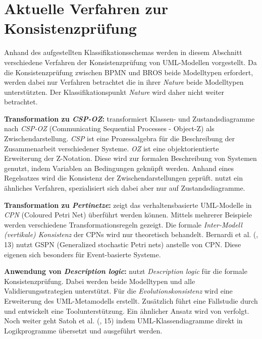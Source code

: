 \section{Aktuelle Verfahren zur Konsistenzprüfung}

Anhand des aufgestellten Klassifikationsschemas werden in diesem Abschnitt verschiedene Verfahren der Konsistenzprüfung von UML-Modellen vorgestellt.
Da die Konsistenzprüfung zwischen BPMN und BROS beide Modelltypen erfordert, werden dabei nur Verfahren betrachtet die in ihrer \emph{Nature} beide Modelltypen unterstützten.
Der Klassifikationspunkt \emph{Nature} wird daher nicht weiter betrachtet.

\textbf{Transformation zu \emph{CSP-OZ}:}
\cite{Rasch2003} transformiert Klassen- und Zustandsdiagramme nach \emph{CSP-OZ} (Communicating Sequential Processes - Object-Z) als Zwischendarstellung.
\emph{CSP} ist eine Prozessalgebra für die Beschreibung der Zusammenarbeit verschiedener Systeme. 
\emph{OZ} ist eine objektorientierte Erweiterung der Z-Notation.
Diese wird zur formalen Beschreibung von Systemen genutzt, indem Variablen an Bedingungen geknüpft werden.
Anhand eines Regelsatzes wird die Konsistenz der Zwischendarstellungen geprüft.
\cite{Kim2004} nutzt ein ähnliches Verfahren, spezialisiert sich dabei aber nur auf Zustandsdiagramme.

\textbf{Transformation zu \emph{Pertinetze}:}
\cite{Shinkawa2006} zeigt das verhaltensbasierte UML-Modelle in \emph{CPN} (Coloured Petri Net) überführt werden können.
Mittels mehrerer Beispiele werden verschiedene Transformationsregeln gezeigt.
Die formale \emph{Inter-Modell (vertikale) Konsistenz} der CPNs wird nur theoretisch behandelt.
Bernardi et al. (\cite{Usman2008}, 13) nutzt GSPN (Generalized stochastic Petri nets) anstelle von CPN.
Diese eigenen sich besonders für Event-basierte Systeme.

\textbf{Anwendung von \emph{Description logic}:}
\cite{Mens2005} nutzt \emph{Description logic} für die formale Konsistenzprüfung.
Dabei werden beide Modelltypen und alle Validierungsstrategien unterstützt.
Für die \emph{Evolutionskonsistenz} wird eine Erweiterung des UML-Metamodells erstellt.
Zusätzlich führt \cite{Mens2005} eine Fallstudie durch und entwickelt eine Toolunterstützung.
Ein ähnlicher Ansatz wird von \cite{Simmonds2004} verfolgt.
Noch weiter geht Satoh et al. (\cite{Usman2008}, 15) indem UML-Klassendiagramme direkt in Logikprogramme übersetzt und ausgeführt werden.

